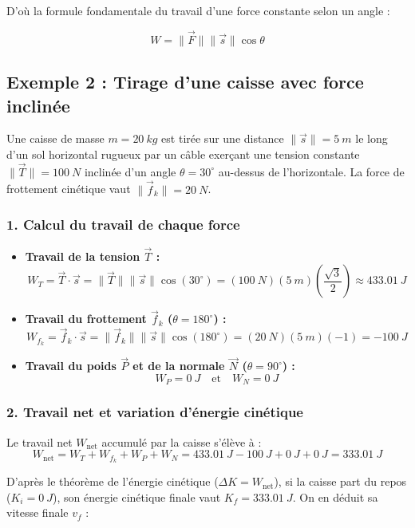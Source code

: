\documentclass[11pt,openany]{book}
\begin{document}
D'où la formule fondamentale du travail d'une force constante selon un angle :

\[
\boxed{W = \|\vec{F}\| \|\vec{s}\| \cos\theta}
\]

\subsection*{Exemple 2 : Tirage d'une caisse avec force inclinée}

Une caisse de masse $m = \SI{20}{kg}$ est tirée sur une distance $\|\vec{s}\| = \SI{5}{m}$ le long d'un sol horizontal rugueux par un câble exerçant une tension constante $\|\vec{T}\| = \SI{100}{N}$ inclinée d'un angle $\theta = 30^\circ$ au-dessus de l'horizontale. La force de frottement cinétique vaut $\|\vec{f}_k\| = \SI{20}{N}$.

\subsubsection*{1. Calcul du travail de chaque force}

\begin{itemize}
    \item \textbf{Travail de la tension $\vec{T}$ :}
    \[
    W_T = \vec{T} \cdot \vec{s} = \|\vec{T}\| \|\vec{s}\| \cos(30^\circ) = (\SI{100}{N})(\SI{5}{m})\left(\frac{\sqrt{3}}{2}\right) \approx \SI{433.01}{J}
    \]

    \item \textbf{Travail du frottement $\vec{f}_k$ ($\theta = 180^\circ$) :}
    \[
    W_{f_k} = \vec{f}_k \cdot \vec{s} = \|\vec{f}_k\| \|\vec{s}\| \cos(180^\circ) = (\SI{20}{N})(\SI{5}{m})(-1) = \SI{-100}{J}
    \]

    \item \textbf{Travail du poids $\vec{P}$ et de la normale $\vec{N}$ ($\theta = 90^\circ$) :}
    \[
    W_P = \SI{0}{J} \quad \text{et} \quad W_N = \SI{0}{J}
    \]
\end{itemize}

\subsubsection*{2. Travail net et variation d'énergie cinétique}

Le travail net $W_{\text{net}}$ accumulé par la caisse s'élève à :
\[
W_{\text{net}} = W_T + W_{f_k} + W_P + W_N = \SI{433.01}{J} - \SI{100}{J} + \SI{0}{J} + \SI{0}{J} = \SI{333.01}{J}
\]

D'après le théorème de l'énergie cinétique ($\Delta K = W_{\text{net}}$), si la caisse part du repos ($K_i = \SI{0}{J}$), son énergie cinétique finale vaut $K_f = \SI{333.01}{J}$. On en déduit sa vitesse finale $v_f$ :
\end{document}
